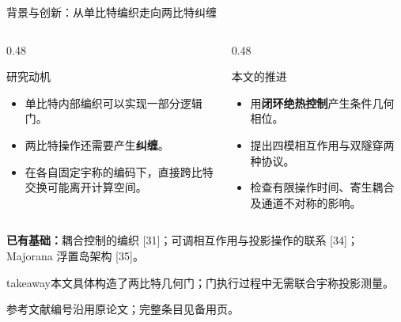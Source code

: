 \documentclass[aspectratio=169,11pt]{beamer}
\newcommand{\source}[1]{{\par\vspace{0.1cm}\fontsize{7.5}{10}\selectfont\color{Muted}#1\par}}
\newcommand{\takeaway}[1]{%
  \begin{beamercolorbox}[wd=\linewidth,sep=0.6em]{takeaway}\small #1\end{beamercolorbox}}
\begin{document}
\begin{frame}[t,shrink=2]{背景与创新：从单比特编织走向两比特纠缠}
  \begin{columns}[T,onlytextwidth]
    \begin{column}{0.48\textwidth}
      \begin{block}{研究动机}
        \begin{itemize}\setlength{\itemsep}{0.16cm}
          \item 单比特内部编织可以实现一部分逻辑门。
          \item 两比特操作还需要产生\textbf{纠缠}。
          \item 在各自固定宇称的编码下，直接跨比特交换可能离开计算空间。
        \end{itemize}
      \end{block}
    \end{column}
    \begin{column}{0.48\textwidth}
      \begin{block}{本文的推进}
        \begin{itemize}\setlength{\itemsep}{0.16cm}
          \item 用\textbf{闭环绝热控制}产生条件几何相位。
          \item 提出四模相互作用与双隧穿两种协议。
          \item 检查有限操作时间、寄生耦合及通道不对称的影响。
        \end{itemize}
      \end{block}
    \end{column}
  \end{columns}
  \vspace{0.12cm}
  \small
  \textbf{已有基础：}耦合控制的编织 [31]；可调相互作用与投影操作的联系 [34]；
  Majorana 浮置岛架构 [35]。
  \vspace{0.12cm}
  \takeaway{本文具体构造了两比特几何门；门执行过程中无需联合宇称投影测量。}
  \source{参考文献编号沿用原论文；完整条目见备用页。}
\end{frame}
\end{document}
